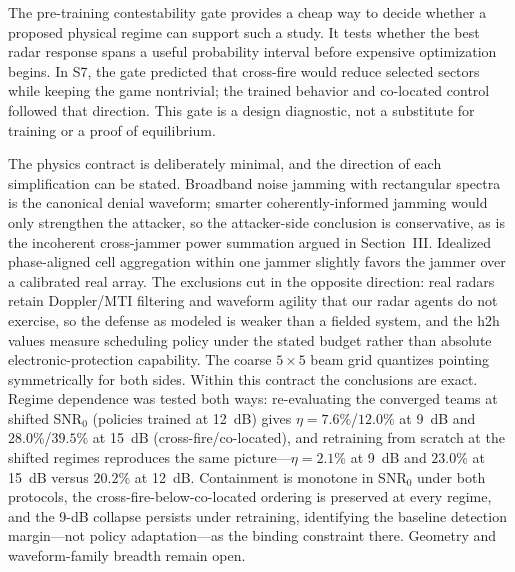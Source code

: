 The pre-training contestability gate provides a cheap way to decide whether a proposed physical regime can support such a study. It tests whether the best radar response spans a useful probability interval before expensive optimization begins. In S7, the gate predicted that cross-fire would reduce selected sectors while keeping the game nontrivial; the trained behavior and co-located control followed that direction. This gate is a design diagnostic, not a substitute for training or a proof of equilibrium.

The physics contract is deliberately minimal, and the direction of each simplification can be stated. Broadband noise jamming with rectangular spectra is the canonical denial waveform; smarter coherently-informed jamming would only strengthen the attacker, so the attacker-side conclusion is conservative, as is the incoherent cross-jammer power summation argued in Section~III. Idealized phase-aligned cell aggregation within one jammer slightly favors the jammer over a calibrated real array. The exclusions cut in the opposite direction: real radars retain Doppler/MTI filtering and waveform agility that our radar agents do not exercise, so the defense as modeled is weaker than a fielded system, and the h2h values measure scheduling policy under the stated budget rather than absolute electronic-protection capability. The coarse $5\times5$ beam grid quantizes pointing symmetrically for both sides. Within this contract the conclusions are exact. Regime dependence was tested both ways: re-evaluating the converged teams at shifted SNR$_0$ (policies trained at 12~dB) gives $\eta=7.6\%$/$12.0\%$ at 9~dB and $28.0\%$/$39.5\%$ at 15~dB (cross-fire/co-located), and retraining from scratch at the shifted regimes reproduces the same picture---$\eta=2.1\%$ at 9~dB and $23.0\%$ at 15~dB versus $20.2\%$ at 12~dB. Containment is monotone in SNR$_0$ under both protocols, the cross-fire-below-co-located ordering is preserved at every regime, and the 9-dB collapse persists under retraining, identifying the baseline detection margin---not policy adaptation---as the binding constraint there. Geometry and waveform-family breadth remain open.

